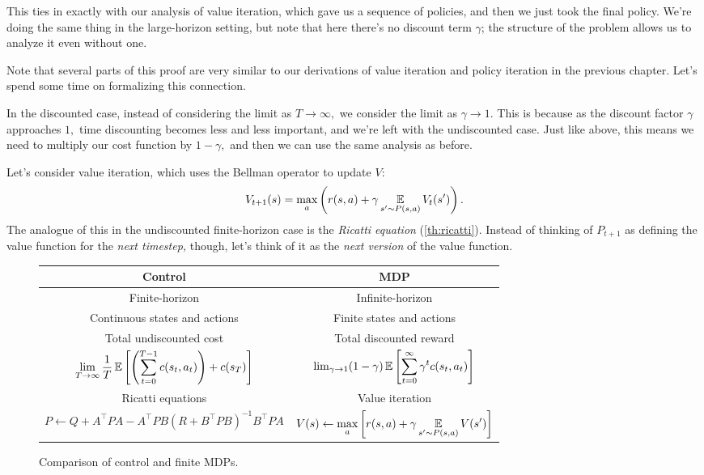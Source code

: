 \documentclass[../main/main]{subfiles}
\begin{document}
This ties in exactly with our analysis of value iteration, which gave us a sequence of policies,
and then we just took the final policy.
We're doing the same thing in the large-horizon setting, but note that here there's
no discount term $\gamma$; the structure of the problem allows us to analyze it even without one.

Note that several parts of this proof are very similar to our derivations of
value iteration and policy iteration in the previous chapter.
Let's spend some time on formalizing this connection.

In the discounted case, instead of considering the limit as $T \to \infty,$ we consider the limit as $\gamma \to 1.$ This is because as the discount factor $\gamma$ approaches $1,$ time discounting becomes less and less important, and we're left with the undiscounted case. Just like above, this means we need to
multiply our cost function by $1 - \gamma,$ and then we can use the same analysis as before.

Let's consider value iteration, which uses the Bellman operator to update $V$: \[
    V_{t+1}(s) = \max_a \left( r(s, a) + \gamma \operatorname*{\mathbb{E}}_{s' \sim P(s, a)} V_t(s') \right).
\]
The analogue of this in the undiscounted finite-horizon case is the \emph{Ricatti equation} (\autoref{th:ricatti}).
Instead of thinking of $P_{t+1}$ as defining the value function for the \emph{next timestep,} though, let's think of it as the \emph{next version} of the value function.


\begin{figure}[h]
    \centering
    \begin{tabular}{c|c}
        \textbf{Control} & \textbf{MDP} \\
        \hline
        Finite-horizon & Infinite-horizon \\
        Continuous states and actions & Finite states and actions \\
        Total undiscounted cost & Total discounted reward \\
        $\displaystyle \lim_{T \to \infty} \frac{1}{T} \operatorname*{\mathbb{E}} \left[ \left( \sum_{t=0}^{T-1} c(s_t, a_t) \right) + c(s_T) \right]$ & $\lim_{\gamma \to 1} \displaystyle (1 - \gamma) \operatorname*{\mathbb{E}} \left[ \sum_{t=0}^{\infty} \gamma^t c(s_t, a_t) \right]$ \\
        Ricatti equations & Value iteration \\
        $\displaystyle P \gets Q + A^\top P A - A^\top P B (R + B^\top P B)^{-1} B^\top P A$ & $\displaystyle V(s) \gets \max_a \left[ r(s, a) + \gamma \operatorname*{\mathbb{E}}_{s' \sim P(s, a)} V(s') \right]$
    \end{tabular}
    \caption{Comparison of control and finite MDPs.}
    \label{fig:control_mdp}
\end{figure}
\end{document}
